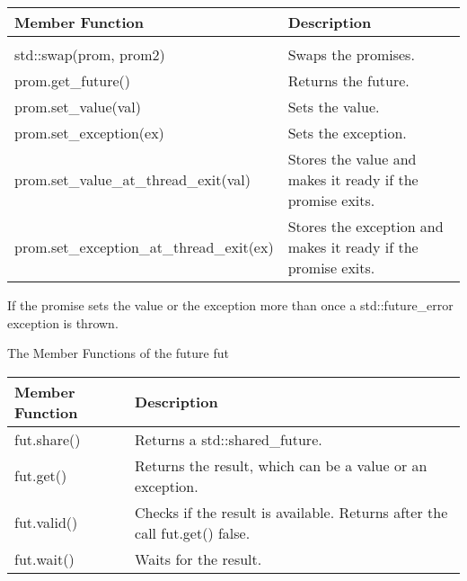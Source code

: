 \begin{longtable}[c]{|l|l|}
\hline
\textbf{Member Function} & \textbf{Description} \\ \hline
\endfirsthead
%
\endhead
%
\begin{tabular}[c]{@{}l@{}}prom.swap(prom2) and\\ std::swap(prom, prom2)\end{tabular} & Swaps the promises.                                           \\ \hline
prom.get\_future()       & Returns the future.  \\ \hline
prom.set\_value(val)     & Sets the value.      \\ \hline
prom.set\_exception(ex)  & Sets the exception.  \\ \hline
prom.set\_value\_at\_thread\_exit(val)                                                & Stores the value and makes it ready if the promise exits.     \\ \hline
prom.set\_exception\_at\_thread\_exit(ex)                                             & Stores the exception and makes it ready if the promise exits. \\ \hline
\end{longtable}

If the promise sets the value or the exception more than once a std::future\_error exception is thrown.

\begin{center}
The Member Functions of the future fut
\end{center}

\begin{longtable}[c]{|l|l|}
\hline
\textbf{Member Function} & \textbf{Description}           \\ \hline
\endfirsthead
%
\endhead
%
fut.share()              & Returns a std::shared\_future. \\ \hline
fut.get()   & Returns the result, which can be a value or an exception.                  \\ \hline
fut.valid() & Checks if the result is available. Returns after the call fut.get() false. \\ \hline
fut.wait()               & Waits for the result.          \\ \hline
\end{longtable}

